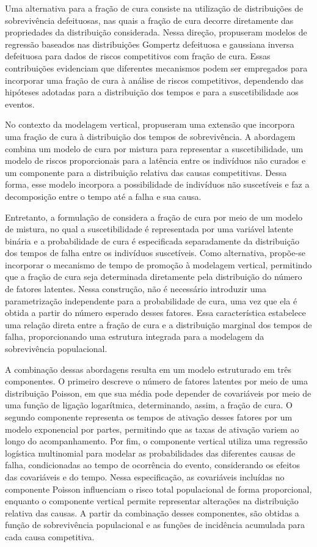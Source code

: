 \documentclass[11pt,a4paper]{article}
\begin{document}
Uma alternativa para a fração de cura consiste na utilização de distribuições de sobrevivência defeituosas, nas quais a fração de cura decorre diretamente das propriedades da distribuição considerada. Nessa direção, \cite{silpa2026defective} propuseram modelos de regressão baseados nas distribuições Gompertz defeituosa e gaussiana inversa defeituosa para dados de riscos competitivos com fração de cura. Essas contribuições evidenciam que diferentes mecanismos podem ser empregados para incorporar uma fração de cura à análise de riscos competitivos, dependendo das hipóteses adotadas para a distribuição dos tempos e para a suscetibilidade aos eventos.

No contexto da modelagem vertical, \cite{Nicolaie2019} propuseram uma extensão que incorpora uma fração de cura à distribuição dos tempos de sobrevivência. A abordagem combina um modelo de cura por mistura para representar a suscetibilidade, um modelo de riscos proporcionais para a latência entre os indivíduos não curados e um componente para a distribuição relativa das causas competitivas. Dessa forma, esse modelo incorpora a possibilidade de indivíduos não suscetíveis e faz a decomposição entre o tempo até a falha e sua causa.

Entretanto, a formulação de \citet{Nicolaie2019} considera a fração de cura por meio de um modelo de mistura, no qual a suscetibilidade é representada por uma variável latente binária e a probabilidade de cura é especificada separadamente da distribuição dos tempos de falha entre os indivíduos suscetíveis. Como alternativa, propõe-se incorporar o mecanismo de tempo de promoção à modelagem vertical, permitindo que a fração de cura seja determinada diretamente pela distribuição do número de fatores latentes. Nessa construção, não é necessário introduzir uma parametrização independente para a probabilidade de cura, uma vez que ela é obtida a partir do número esperado desses fatores. Essa característica estabelece uma relação direta entre a fração de cura e a distribuição marginal dos tempos de falha, proporcionando uma estrutura integrada para a modelagem da sobrevivência populacional.

A combinação dessas abordagens resulta em um modelo estruturado em três componentes. O primeiro descreve o número de fatores latentes por meio de uma distribuição Poisson, em que sua média pode depender de covariáveis por meio de uma função de ligação logarítmica, determinando, assim, a fração de cura. O segundo componente representa os tempos de ativação desses fatores por um modelo exponencial por partes, permitindo que as taxas de ativação variem ao longo do acompanhamento. Por fim, o componente vertical utiliza uma regressão logística multinomial para modelar as probabilidades das diferentes causas de falha, condicionadas ao tempo de ocorrência do evento, considerando os efeitos das covariáveis e do tempo. Nessa especificação, as covariáveis incluídas no componente Poisson influenciam o risco total populacional de forma proporcional, enquanto o componente vertical permite representar alterações na distribuição relativa das causas. A partir da combinação desses componentes, são obtidas a função de sobrevivência populacional e as funções de incidência acumulada para cada causa competitiva.
\end{document}
